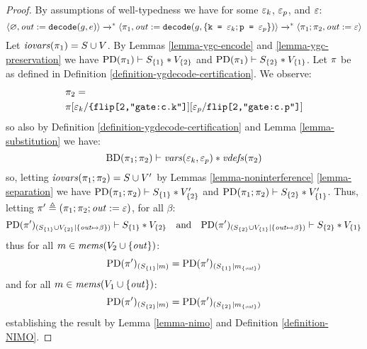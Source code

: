 \begin{proof}
  By assumptions of well-typedness we
  have for some $\varepsilon_k$, $\varepsilon_p$, and $\varepsilon$:
  $$
  \langle \varnothing,\mathit{out} := \texttt{decode}(g,e) \rangle \xrightarrow{}^{*}
  \langle \pi_1,\mathit{out} := \texttt{decode}(g,\{ \texttt{k = }\varepsilon_k;  \texttt{p = }\varepsilon_p\}) \rangle
  \xrightarrow{}^{*} \langle \pi_1;\pi_2,\mathit{out} := \varepsilon \rangle
  $$
  Let $\mathit{iovars}(\pi_1) = S \cup V$.
  By Lemmas \ref{lemma-ygc-encode} and \ref{lemma-ygc-preservation} we
  have $\mathrm{PD}(\pi_1) \vdash S_{\{1\}} * V_{\{2\}}$ and
  $\mathrm{PD}(\pi_1) \vdash S_{\{2\}} * V_{\{1\}}$.
  Let $\pi$ be as defined in Definition \ref{definition-ygdecode-certification}.
  We observe:
  \begin{eqnarray*}
    & \pi_2 = \\ 
    & \pi[\varepsilon_k/\texttt{\{flip[2,"gate:c.k"]}][\varepsilon_p/\texttt{flip[2,"gate:c.p"]}]
  \end{eqnarray*}
  so also by  Definition \ref{definition-ygdecode-certification} and
  Lemma \ref{lemma-substitution} we have:
  $$
  \mathrm{BD}(\pi_1;\pi_2) \vdash \mathit{vars}(\varepsilon_k,\varepsilon_p) * \mathit{vdefs}(\pi_2)
  $$
  so, letting $\mathit{iovars}(\pi_1;\pi_2) = S \cup V'$ by
  Lemmas \ref{lemma-noninterference} \ref{lemma-separation} we have
  $\mathrm{PD}(\pi_1;\pi_2) \vdash S_{\{1\}} * V'_{\{2\}}$ and
  $\mathrm{PD}(\pi_1;\pi_2) \vdash S_{\{2\}} * V'_{\{1\}}$.
  Thus, letting $\pi' \triangleq (\pi_1;\pi_2;\mathit{out} := \varepsilon)$, for all $\beta$:
  $$\mathrm{PD}(\pi')_{({S_{\{1\}} \cup V_{\{2\}}}|{\{ \mathit{out} \mapsto \beta \}})} \vdash S_{\{1\}} * V_{\{2\}}
  \quad \text{and} \quad
    \mathrm{PD}(\pi')_{({S_{\{2\}} \cup V_{\{1\}}}|{\{ \mathit{out} \mapsto \beta \}})} \vdash S_{\{2\}} * V_{\{1\}}$$
  thus for all $m \in \mathit{mems}(V_2 \cup \{ \mathit{out} \})$:
  $$\mathrm{PD}(\pi')_{({S_{\{1\}}}|{m})}
  = \mathrm{PD}(\pi')_{({S_{\{1\}}}|{m_{\{\mathit{out}\}}})}$$
  and for all $m \in \mathit{mems}(V_1 \cup \{ \mathit{out} \})$:
  $$\mathrm{PD}(\pi')_{({S_{\{2\}}}|{m})}
  = \mathrm{PD}(\pi')_{({S_{\{2\}}}|{m_{\{\mathit{out}\}}})}$$
  establishing the result by Lemma \ref{lemma-nimo} and Definition \ref{definition-NIMO}.
\end{proof}

